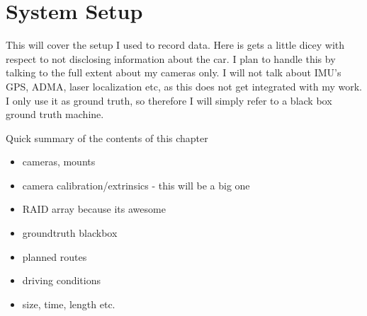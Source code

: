 \chapter{System Setup}
\label{chapter:system_setup}

This will cover the setup I used to record data.  Here is gets a little dicey with respect to not
disclosing information about the car.  I plan to handle this by talking to the full extent about my
cameras only.  I will not talk about IMU's GPS, ADMA, laser localization etc, as this does not get
integrated with my work. I only use it as ground truth, so therefore I will simply refer to a black
box ground truth machine.

Quick summary of the contents of this chapter

\begin{itemize}
 \item cameras, mounts
 \item camera calibration/extrinsics - this will be a big one
 \item RAID array because its awesome
 \item groundtruth blackbox
 \item planned routes
 \item driving conditions
 \item size, time, length etc.
\end{itemize}



